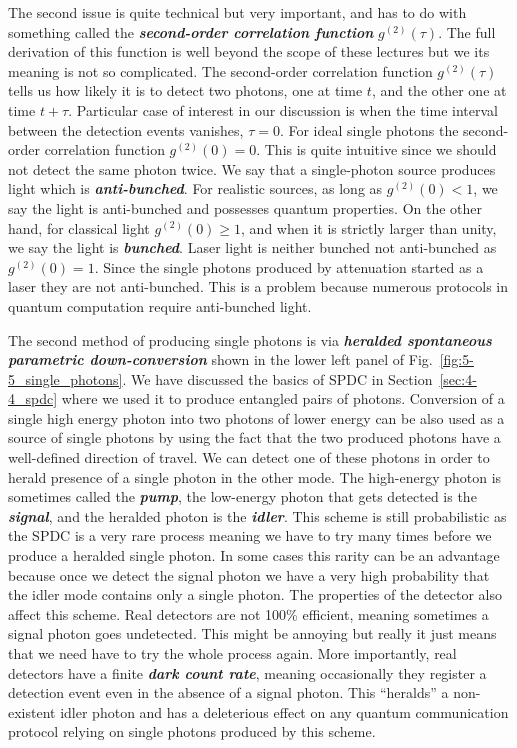 The second issue is quite technical but very important, and has to do with something called the \textit{\textbf{second-order correlation function}} $g^{(2)}(\tau)$.
The full derivation of this function is well beyond the scope of these lectures but we its meaning is not so complicated.
The second-order correlation function $g^{(2)}(\tau)$ tells us how likely it is to detect two photons, one at time $t$, and the other one at time $t+\tau$.
Particular case of interest in our discussion is when the time interval between the detection events vanishes, $\tau = 0$.
For ideal single photons the second-order correlation function $g^{(2)}(0) = 0$.
This is quite intuitive since we should not detect the same photon twice.
We say that a single-photon source produces light which is \textit{\textbf{anti-bunched}}.
For realistic sources, as long as $g^{(2)}(0) < 1$, we say the light is anti-bunched and possesses quantum properties.
On the other hand, for classical light $g^{(2)}(0) \geq 1$, and when it is strictly larger than unity, we say the light is \textit{\textbf{bunched}}.
Laser light is neither bunched not anti-bunched as $g^{(2)}(0)=1$.
Since the single photons produced by attenuation started as a laser they are not anti-bunched.
This is a problem because numerous protocols in quantum computation require anti-bunched light.

The second method of producing single photons is via \textit{\textbf{heralded spontaneous parametric down-conversion}} shown in the lower left panel of Fig.~\ref{fig:5-5_single_photons}.
We have discussed the basics of SPDC in Section~\ref{sec:4-4_spdc} where we used it to produce entangled pairs of photons.
Conversion of a single high energy photon into two photons of lower energy can be also used as a source of single photons by using the fact that the two produced photons have a well-defined direction of travel.
We can detect one of these photons in order to herald presence of a single photon in the other mode.
The high-energy photon is sometimes called the \textit{\textbf{pump}}, the low-energy photon that gets detected is the \textit{\textbf{signal}}, and the heralded photon is the \textit{\textbf{idler}}.
This scheme is still probabilistic as the SPDC is a very rare process meaning we have to try many times before we produce a heralded single photon.
In some cases this rarity can be an advantage because once we detect the signal photon we have a very high probability that the idler mode contains only a single photon.
The properties of the detector also affect this scheme.
Real detectors are not 100\% efficient, meaning sometimes a signal photon goes undetected.
This might be annoying but really it just means that we need have to try the whole process again.
More importantly, real detectors have a finite \textit{\textbf{dark count rate}}, meaning occasionally they register a detection event even in the absence of a signal photon.
This ``heralds'' a non-existent idler photon and has a deleterious effect on any quantum communication protocol relying on single photons produced by this scheme.

